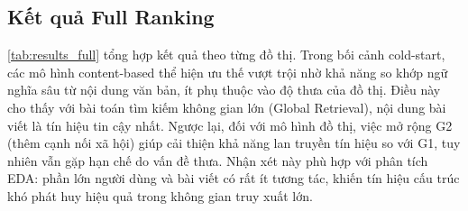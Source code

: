 \documentclass[11pt]{article}
\begin{document}
\subsection{Kết quả Full Ranking}
\autoref{tab:results_full} tổng hợp kết quả theo từng đồ thị. Trong bối cảnh cold-start, các mô hình content-based thể hiện ưu thế vượt trội nhờ khả năng so khớp ngữ nghĩa sâu từ nội dung văn bản, ít phụ thuộc vào độ thưa của đồ thị. Điều này cho thấy với bài toán tìm kiếm không gian lớn (Global Retrieval), nội dung bài viết là tín hiệu tin cậy nhất. Ngược lại, đối với mô hình đồ thị, việc mở rộng G2 (thêm cạnh nối xã hội) giúp cải thiện khả năng lan truyền tín hiệu so với G1, tuy nhiên vẫn gặp hạn chế do vấn đề thưa. Nhận xét này phù hợp với phân tích EDA: phần lớn người dùng và bài viết có rất ít tương tác, khiến tín hiệu cấu trúc khó phát huy hiệu quả trong không gian truy xuất lớn.
\end{document}
